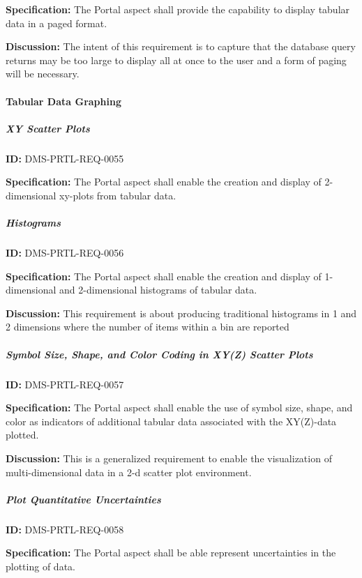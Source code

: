 \documentclass[SE,toc,lsstdraft]{lsstdoc}
\begin{document}
\textbf{Specification:}
The Portal aspect shall provide the capability to display tabular data in a paged format.

\textbf{Discussion:}
The intent of this requirement is to capture that the database query returns may be too large to display all at once to the user and a form of paging will be necessary.

\paragraph{Tabular Data Graphing}\hfill  %

\subparagraph{XY Scatter Plots}\hfill  %

\label{DMS-PRTL-REQ-0055}
\textbf{ID:} DMS-PRTL-REQ-0055

\textbf{Specification:}
The Portal aspect shall enable the creation and display of 2-dimensional xy-plots from tabular data.

\subparagraph{Histograms}\hfill  %

\label{DMS-PRTL-REQ-0056}
\textbf{ID:} DMS-PRTL-REQ-0056

\textbf{Specification:}
The Portal aspect shall enable the creation and display of 1-dimensional and 2-dimensional histograms of tabular data.

\textbf{Discussion:}
This requirement is about producing traditional histograms in 1 and 2 dimensions where the number of items within a bin are reported

\subparagraph{Symbol Size, Shape, and Color Coding in XY(Z) Scatter Plots}\hfill  %

\label{DMS-PRTL-REQ-0057}
\textbf{ID:} DMS-PRTL-REQ-0057

\textbf{Specification:}
The Portal aspect shall enable the use of symbol size, shape, and color as indicators of additional tabular data associated with the XY(Z)-data plotted.

\textbf{Discussion:}
This is a generalized requirement to enable the visualization of multi-dimensional data in a 2-d scatter plot environment.

\subparagraph{Plot Quantitative Uncertainties}\hfill  %

\label{DMS-PRTL-REQ-0058}
\textbf{ID:} DMS-PRTL-REQ-0058

\textbf{Specification:}
The Portal aspect shall be able represent uncertainties in the plotting of data.
\end{document}
